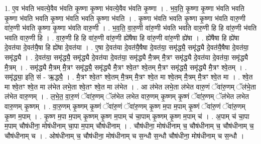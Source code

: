 \documentclass[17pt]{extarticle}
\begin{document}
1. ए॒व भ॑वति भवत्ये॒वैव भ॑वति कृ॒ष्णा कृ॒ष्णा भ॑वत्ये॒वैव भ॑वति कृ॒ष्णा । . भ॒व॒ति॒ कृ॒ष्णा कृ॒ष्णा भ॑वति भवति कृ॒ष्णा भ॑वति भवति कृ॒ष्णा भ॑वति भवति कृ॒ष्णा भ॑वति । . कृ॒ष्णा भ॑वति भवति कृ॒ष्णा कृ॒ष्णा भ॑वति वारु॒णी वा॑रु॒णी भ॑वति कृ॒ष्णा कृ॒ष्णा भ॑वति वारु॒णी । . भ॒व॒ति॒ वा॒रु॒णी वा॑रु॒णी भ॑वति भवति वारु॒णी हि हि वा॑रु॒णी भ॑वति भवति वारु॒णी हि । . वा॒रु॒णी हि हि वा॑रु॒णी वा॑रु॒णी ह्ये॑षैषा हि वा॑रु॒णी वा॑रु॒णी ह्ये॑षा । . ह्ये॑षैषा हि ह्ये॑षा दे॒वत॑या दे॒वत॑यै॒षा हि ह्ये॑षा दे॒वत॑या । . ए॒षा दे॒वत॑या दे॒वत॑यै॒षैषा दे॒वत॑या॒ समृ॑द्ध्यै॒ समृ॑द्ध्यै दे॒वत॑यै॒षैषा दे॒वत॑या॒ समृ॑द्ध्यै । . दे॒वत॑या॒ समृ॑द्ध्यै॒ समृ॑द्ध्यै दे॒वत॑या दे॒वत॑या॒ समृ॑द्ध्यै मै॒त्रम् मै॒त्रꣳ समृ॑द्ध्यै दे॒वत॑या दे॒वत॑या॒ समृ॑द्ध्यै मै॒त्रम् । . समृ॑द्ध्यै मै॒त्रम् मै॒त्रꣳ समृ॑द्ध्यै॒ समृ॑द्ध्यै मै॒त्रꣳ श्वे॒तꣳ श्वे॒तम् मै॒त्रꣳ समृ॑द्ध्यै॒ समृ॑द्ध्यै मै॒त्रꣳ श्वे॒तम् । . समृ॑द्ध्या॒ इति॒ सं - ऋ॒द्ध्यै॒ । . मै॒त्रꣳ श्वे॒तꣳ श्वे॒तम् मै॒त्रम् मै॒त्रꣳ श्वे॒त मा श्वे॒तम् मै॒त्रम् मै॒त्रꣳ श्वे॒त मा । . श्वे॒त मा श्वे॒तꣳ श्वे॒त मा ल॑भेत लभे॒ता श्वे॒तꣳ श्वे॒त मा ल॑भेत । . आ ल॑भेत लभे॒ता ल॑भेत वारु॒णं ॅवा॑रु॒णम् ॅल॑भे॒ता ल॑भेत वारु॒णम् । . ल॒भे॒त॒ वा॒रु॒णं ॅवा॑रु॒णम् ॅल॑भेत लभेत वारु॒णम् कृ॒ष्णम् कृ॒ष्णं ॅवा॑रु॒णम् ॅल॑भेत लभेत वारु॒णम् कृ॒ष्णम् । . वा॒रु॒णम् कृ॒ष्णम् कृ॒ष्णं ॅवा॑रु॒णं ॅवा॑रु॒णम् कृ॒ष्ण म॒पा म॒पाम् कृ॒ष्णं ॅवा॑रु॒णं ॅवा॑रु॒णम् कृ॒ष्ण म॒पाम् । . कृ॒ष्ण म॒पा म॒पाम् कृ॒ष्णम् कृ॒ष्ण म॒पाम् च॑ चा॒पाम् कृ॒ष्णम् कृ॒ष्ण म॒पाम् च॑ । . अ॒पाम् च॑ चा॒पा म॒पाम् चौष॑धीना॒ मोष॑धीनाम् चा॒पा म॒पाम् चौष॑धीनाम् । . चौष॑धीना॒ मोष॑धीनाम् च॒ चौष॑धीनाम् च॒ चौष॑धीनाम् च॒ चौष॑धीनाम् च । . ओष॑धीनाम् च॒ चौष॑धीना॒ मोष॑धीनाम् च स॒न्धौ स॒न्धौ चौष॑धीना॒ मोष॑धीनाम् च स॒न्धौ । \newline
\end{document}
